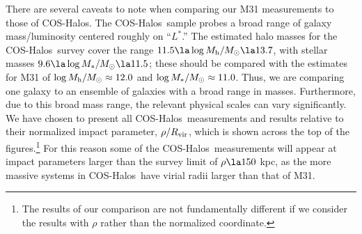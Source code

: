 \documentclass[12pt,preprint]{aastex6}
\newcommand{\Rvir}{\ensuremath{R_{\rm vir}}\relax}
\newcommand{\msun}{\ensuremath{M_\odot}\relax}
\newcommand{\lstar}{\ensuremath{L^*}}
\newcommand{\coshalos}{COS-Halos}
\begin{document}
There are several caveats to note when comparing our M31 measurements
to those of \coshalos. The \coshalos\ sample probes a broad range of
galaxy mass/luminosity centered roughly on ``\lstar.''  The estimated
halo masses for the \coshalos\ survey cover the range
$11.5 \la \log M_{\rm h} / \msun \la 13.7$, with stellar masses
$9.6 \la \log M_* / \msun \la 11.5$; these should be compared with the
\citet{tamm2012} estimates for M31 of
$\log M_{\rm h} / \msun \approx 12.0$ and
$\log M_* / \msun \approx 11.0$. Thus, we are comparing one galaxy to
an ensemble of galaxies with a broad range in masses. Furthermore, due
to this broad mass range, the relevant physical scales can vary
significantly. We have chosen to present all \coshalos\ measurements
and results relative to their normalized impact parameter,
$\rho / \Rvir$, which is shown across the top of the
figures.\footnote{The results of our comparison are not fundamentally
  different if we consider the results with $\rho$ rather than the
  normalized coordinate.} For this reason some of the \coshalos\
measurements will appear at impact parameters larger than the survey
limit of $\rho \la 150$ kpc, as the more massive systems in \coshalos\
have virial radii larger than that of
M31. %
\end{document}
